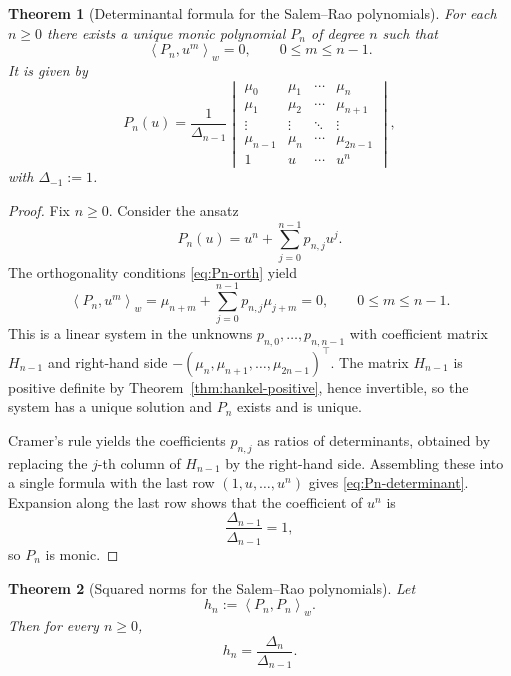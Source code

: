 \documentclass[11pt]{amsart}
\numberwithin{equation}{section}
\newtheorem{theorem}{Theorem}[section]
\theoremstyle{definition}
\newcommand{\mom}[1]{\mu_{#1}}
\newcommand{\Hankel}[1]{H_{#1}}
\newcommand{\DeltaH}[1]{\Delta_{#1}}
\newcommand{\inner}[2]{\left\langle #1,#2\right\rangle_{w}}
\begin{document}
\begin{theorem}[Determinantal formula for the Salem--Rao polynomials]\label{thm:Pn-det}
For each $n\ge 0$ there exists a unique monic polynomial $P_{n}$ of degree $n$
such that
\begin{equation}\label{eq:Pn-orth}
\inner{P_{n}}{u^{m}}=0,\qquad 0\le m\le n-1.
\end{equation}
It is given by
\begin{equation}\label{eq:Pn-determinant}
P_{n}(u)
=\frac{1}{\DeltaH{n-1}}
\begin{vmatrix}
\mom{0} & \mom{1} & \cdots & \mom{n}\\
\mom{1} & \mom{2} & \cdots & \mom{n+1}\\
\vdots  & \vdots  & \ddots & \vdots\\
\mom{n-1} & \mom{n} & \cdots & \mom{2n-1}\\
1 & u & \cdots & u^{n}
\end{vmatrix},
\end{equation}
with $\DeltaH{-1}:=1$.
\end{theorem}

\begin{proof}
Fix $n\ge 0$. Consider the ansatz
\[
P_{n}(u)=u^{n}+\sum_{j=0}^{n-1}p_{n,j}u^{j}.
\]
The orthogonality conditions \eqref{eq:Pn-orth} yield
\[
\inner{P_{n}}{u^{m}}
=\mom{n+m}+\sum_{j=0}^{n-1}p_{n,j}\mom{j+m}=0,
\qquad 0\le m\le n-1.
\]
This is a linear system in the unknowns $p_{n,0},\dots,p_{n,n-1}$ with
coefficient matrix $\Hankel{n-1}$ and right-hand side
$-(\mom{n},\mom{n+1},\dots,\mom{2n-1})^{\top}$. The matrix $\Hankel{n-1}$ is
positive definite by Theorem~\ref{thm:hankel-positive}, hence invertible, so
the system has a unique solution and $P_{n}$ exists and is unique.

Cramer's rule yields the coefficients $p_{n,j}$ as ratios of determinants,
obtained by replacing the $j$-th column of $\Hankel{n-1}$ by the right-hand
side. Assembling these into a single formula with the last row $(1,u,\dots,u^{n})$
gives \eqref{eq:Pn-determinant}. Expansion along the last row shows that the
coefficient of $u^{n}$ is
\[
\frac{\DeltaH{n-1}}{\DeltaH{n-1}}=1,
\]
so $P_{n}$ is monic.
\end{proof}

\begin{theorem}[Squared norms for the Salem--Rao polynomials]\label{thm:norms}
Let
\[
h_{n}:=\inner{P_{n}}{P_{n}}.
\]
Then for every $n\ge 0$,
\begin{equation}\label{eq:norm-det}
h_{n}=\frac{\DeltaH{n}}{\DeltaH{n-1}}.
\end{equation}
\end{theorem}
\end{document}

